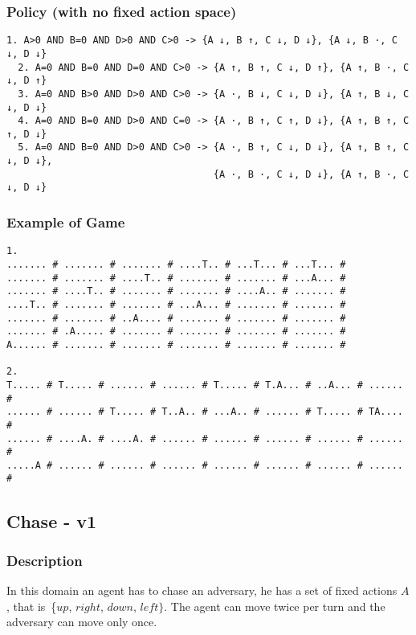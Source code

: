 \documentclass[a4paper]{article}
\begin{document}
\subsubsection{Policy (with no fixed action space)}

\begin{Verbatim}[fontsize=\footnotesize]
  1. A>0 AND B=0 AND D>0 AND C>0 -> {A ↓, B ↑, C ↓, D ↓}, {A ↓, B ·, C ↓, D ↓}
  2. A=0 AND B=0 AND D=0 AND C>0 -> {A ↑, B ↑, C ↓, D ↑}, {A ↑, B ·, C ↓, D ↑}
  3. A=0 AND B>0 AND D>0 AND C>0 -> {A ·, B ↓, C ↓, D ↓}, {A ↑, B ↓, C ↓, D ↓}
  4. A=0 AND B=0 AND D>0 AND C=0 -> {A ·, B ↑, C ↑, D ↓}, {A ↑, B ↑, C ↑, D ↓}
  5. A=0 AND B=0 AND D>0 AND C>0 -> {A ·, B ↑, C ↓, D ↓}, {A ↑, B ↑, C ↓, D ↓},
                                    {A ·, B ·, C ↓, D ↓}, {A ↑, B ·, C ↓, D ↓}

\end{Verbatim}

\subsubsection{Example of Game}
\begin{Verbatim}[fontsize=\footnotesize]
1.
....... # ....... # ....... # ....T.. # ...T... # ...T... #
....... # ....... # ....T.. # ....... # ....... # ...A... #
....... # ....T.. # ....... # ....... # ....A.. # ....... #
....T.. # ....... # ....... # ...A... # ....... # ....... #
....... # ....... # ..A.... # ....... # ....... # ....... #
....... # .A..... # ....... # ....... # ....... # ....... #
A...... # ....... # ....... # ....... # ....... # ....... #

2.
T..... # T..... # ...... # ...... # T..... # T.A... # ..A... # ...... #
...... # ...... # T..... # T..A.. # ...A.. # ...... # T..... # TA.... #
...... # ....A. # ....A. # ...... # ...... # ...... # ...... # ...... #
.....A # ...... # ...... # ...... # ...... # ...... # ...... # ...... #
\end{Verbatim}


\subsection{Chase - v1}
\subsubsection{Description}
In this domain an agent has to chase an adversary, he has a set of fixed actions $A$, that is~\{$up$, $right$, $down$, $left\}$. The agent can move twice per turn and the adversary can move only once.
\end{document}
